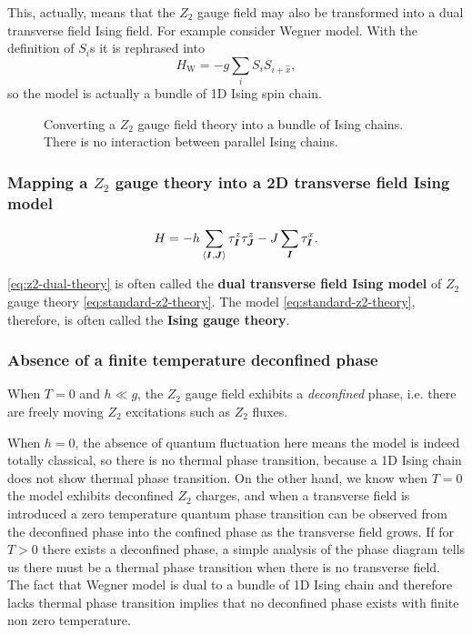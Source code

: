 \documentclass[hyperref, a4paper]{article}
\newcommand*{\pair}[1]{\langle #1 \rangle}
\newcommand*{\concept}[1]{{\textbf{#1}}}
\newcommand*{\Ztwo}{\texorpdfstring{$\mathbb{Z}_2$ }{Z2 }}
\newcommand*{\tfim}{transverse field Ising model}
\def\mathbb#1{#1}%
\begin{document}
This, actually, means that the \Ztwo gauge field may also be transformed into a dual transverse field Ising field.
For example consider Wegner model.
With the definition of $S_i$s it is rephrased into
\begin{equation}
    H_\text{W} = -g \sum_i S_i S_{i+\hat{x}},
\end{equation}
so the model is actually a bundle of 1D Ising spin chain.

\begin{figure}
    \centering
    
    \caption{Converting a \Ztwo gauge field theory into a bundle of Ising chains. There is no interaction between parallel Ising chains.}
\end{figure}

\subsubsection{Mapping a \Ztwo gauge theory into a 2D \tfim{}}

\begin{equation}
    H = - h \sum_{\pair{\vb*{I}, \vb*{J}}} \tau^z_{\vb*{I}} \tau^z_{\vb*{J}} - J \sum_{\vb*{I}} \tau^x_{\vb*{I}}.
    \label{eq:z2-dual-theory}
\end{equation}

\eqref{eq:z2-dual-theory} is often called the \concept{dual \tfim{}} of \Ztwo gauge theory \eqref{eq:standard-z2-theory}.
The model \eqref{eq:standard-z2-theory}, therefore, is often called the \concept{Ising gauge theory}.

\subsubsection{Absence of a finite temperature deconfined phase}\label{sec:absence-of-z2-deconfined-phase}

When $T=0$ and $h \ll g$, the \Ztwo gauge field exhibits a \emph{deconfined} phase, i.e. there are freely moving \Ztwo excitations such as \Ztwo fluxes.

When $h = 0$, the absence of quantum fluctuation here means the model is indeed totally classical, so there is no thermal phase transition, because a 1D Ising chain does not show thermal phase transition.
On the other hand, we know when $T=0$ the model exhibits deconfined \Ztwo charges, and when a transverse field is introduced a zero temperature quantum phase transition can be observed from the deconfined phase into the confined phase as the transverse field grows.
If for $T > 0$ there exists a deconfined phase, a simple analysis of the phase diagram tells us there must be a thermal phase transition when there is no transverse field.
The fact that Wegner model is dual to a bundle of 1D Ising chain and therefore lacks thermal phase transition implies that no deconfined phase exists with finite non zero temperature.
\end{document}
